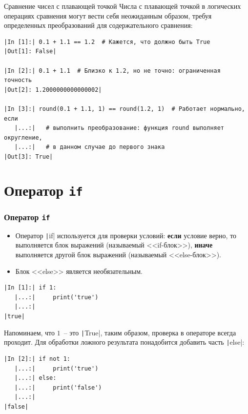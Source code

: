 \documentclass[aspectratio=169]{beamer}	%
\begin{document}
\begin{frame}[fragile]{Сравнение чисел с плавающей точкой}
\scriptsize
Числа с плавающей точкой в логических операциях сравнения могут вести себя неожиданным образом, требуя определенных преобразований для содержательного сравнения:

\begin{verbatim}
|In [1]:| 0.1 + 1.1 == 1.2  # Кажется, что должно быть True 
|Out[1]: False|

|In [2]:| 0.1 + 1.1  # Близко к 1.2, но не точно: ограниченная точность
|Out[2]: 1.2000000000000002|

|In [3]:| round(0.1 + 1.1, 1) == round(1.2, 1)  # Работает нормально, если 
   |...:|   # выполнить преобразование: функция round выполняет округление, 
   |...:|   # в данном случае до первого знака
|Out[3]: True|
\end{verbatim}
\vfill
\end{frame}


\section{Оператор \texttt{if}}

\sectionframe	%

\begin{frame}[fragile]
\frametitle{Оператор \texttt{if}}
\scriptsize
\begin{itemize}
	\item Оператор \texttt|if| используется для проверки условий: \textbf{если} условие верно, то выполняется блок выражений (называемый <<if-блок>>), \textbf{иначе} выполняется другой блок выражений (называемый <<else-блок>>).
	
	\item Блок <<else>> является необязательным. 
\end{itemize}

\begin{verbatim}
|In [1]:| if 1:
   |...:|     print('true')
   |...:|
|true|
\end{verbatim}

Напоминаем, что $1$~-- это \texttt|True|, таким образом, проверка в операторе всегда проходит. Для обработки ложного результата понадобится добавить часть \texttt|else|:

\begin{verbatim}
|In [2]:| if not 1:
   |...:|     print('true')
   |...:| else:
   |...:|     print('false')
   |...:|
|false|
\end{verbatim}
\vfill
\end{frame}
\end{document}
